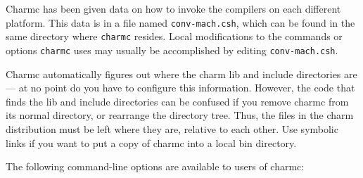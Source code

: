 Charmc has been given data on how to invoke the compilers on each
different platform.  This data is in a file named {\tt conv-mach.csh},
which can be found in the same directory where {\tt charmc} resides.
Local modifications to the commands or options {\tt charmc} uses may
usually be accomplished by editing {\tt conv-mach.csh}.

Charmc automatically figures out where the charm lib and include
directories are --- at no point do you have to configure this
information.  However, the code that finds the lib and include
directories can be confused if you remove charmc from its normal
directory, or rearrange the directory tree.  Thus, the files in the
charm distribution must be left where they are, relative to each
other.  Use symbolic links if you want to put a copy of charmc into
a local bin directory.

The following command-line options are available to users of charmc:

